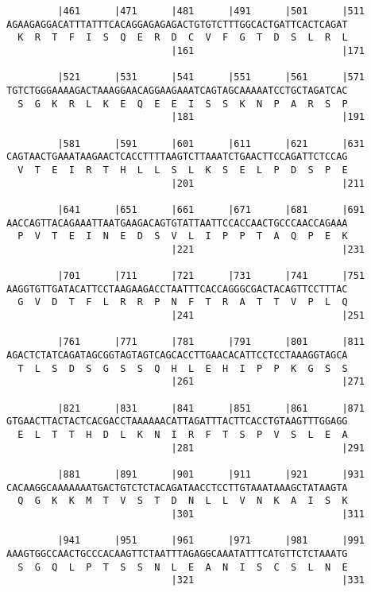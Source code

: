 \documentclass{article}
\begin{document}
\begin{Verbatim}
         |461      |471      |481      |491      |501      |511
AGAAGAGGACATTTATTTCACAGGAGAGAGACTGTGTCTTTGGCACTGATTCACTCAGAT
  K  R  T  F  I  S  Q  E  R  D  C  V  F  G  T  D  S  L  R  L
                             |161                          |171
  
         |521      |531      |541      |551      |561      |571
TGTCTGGGAAAAGACTAAAGGAACAGGAAGAAATCAGTAGCAAAAATCCTGCTAGATCAC
  S  G  K  R  L  K  E  Q  E  E  I  S  S  K  N  P  A  R  S  P
                             |181                          |191
  
         |581      |591      |601      |611      |621      |631
CAGTAACTGAAATAAGAACTCACCTTTTAAGTCTTAAATCTGAACTTCCAGATTCTCCAG
  V  T  E  I  R  T  H  L  L  S  L  K  S  E  L  P  D  S  P  E
                             |201                          |211
  
         |641      |651      |661      |671      |681      |691
AACCAGTTACAGAAATTAATGAAGACAGTGTATTAATTCCACCAACTGCCCAACCAGAAA
  P  V  T  E  I  N  E  D  S  V  L  I  P  P  T  A  Q  P  E  K
                             |221                          |231
  
         |701      |711      |721      |731      |741      |751
AAGGTGTTGATACATTCCTAAGAAGACCTAATTTCACCAGGGCGACTACAGTTCCTTTAC
  G  V  D  T  F  L  R  R  P  N  F  T  R  A  T  T  V  P  L  Q
                             |241                          |251
  
         |761      |771      |781      |791      |801      |811
AGACTCTATCAGATAGCGGTAGTAGTCAGCACCTTGAACACATTCCTCCTAAAGGTAGCA
  T  L  S  D  S  G  S  S  Q  H  L  E  H  I  P  P  K  G  S  S
                             |261                          |271
  
         |821      |831      |841      |851      |861      |871
GTGAACTTACTACTCACGACCTAAAAAACATTAGATTTACTTCACCTGTAAGTTTGGAGG
  E  L  T  T  H  D  L  K  N  I  R  F  T  S  P  V  S  L  E  A
                             |281                          |291
  
         |881      |891      |901      |911      |921      |931
CACAAGGCAAAAAAATGACTGTCTCTACAGATAACCTCCTTGTAAATAAAGCTATAAGTA
  Q  G  K  K  M  T  V  S  T  D  N  L  L  V  N  K  A  I  S  K
                             |301                          |311
  
         |941      |951      |961      |971      |981      |991
AAAGTGGCCAACTGCCCACAAGTTCTAATTTAGAGGCAAATATTTCATGTTCTCTAAATG
  S  G  Q  L  P  T  S  S  N  L  E  A  N  I  S  C  S  L  N  E
                             |321                          |331
  

\end{Verbatim}
\end{document}
